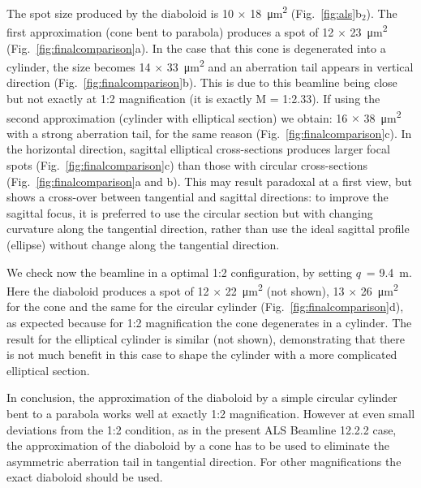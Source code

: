 \documentclass[preprint]{iucr}       %
\newcommand{\inred}[1]{{\color{red}#1}}
\begin{document}
The spot size produced by the diaboloid is 10 $\times$ \SI{18}{\micro\meter^2} (Fig.~\ref{fig:als}b$_2$). The first approximation (cone bent to parabola) produces a spot of 12 $\times$ \SI{23}{\micro\meter^2} (Fig.~\ref{fig:finalcomparison}a). In the case that this cone is degenerated into a cylinder, the size becomes 14 $\times$ \SI{33}{\micro\meter^2} and an aberration tail appears in vertical direction (Fig.~\ref{fig:finalcomparison}b). This is due to this beamline being close but not exactly at 1:2 magnification (it is exactly M = 
\inred{1:2.33}). If using the second approximation (cylinder with elliptical section) we obtain: 16 $\times$ \SI{38}{\micro\meter^2} with a strong aberration tail, for the same reason (Fig.~\ref{fig:finalcomparison}c).
In the horizontal direction,  sagittal elliptical cross-sections produce\inred{s larger} focal spots (Fig.~\ref{fig:finalcomparison}c) than those with circular cross-sections (Fig.~\ref{fig:finalcomparison}a and b). \inred{This may result paradoxal at a first view, but shows a cross-over between tangential and sagittal directions: to improve the sagittal focus, it is preferred to use the circular section but with changing curvature along the tangential direction, rather than use the ideal sagittal profile (ellipse) without change along the tangential direction. }

We check now the beamline in a optimal 1:2 configuration, by setting $q$~= \SI{9.4}{\meter}. Here the diaboloid produces a spot of 12 $\times$ \SI{22}{\micro\meter^2} (not shown), 13 $\times$ \SI{26}{\micro\meter^2} for the cone and \inred{the same} for the circular cylinder (Fig.~\ref{fig:finalcomparison}d), as expected because for 1:2 magnification the cone degenerates in a cylinder. The result for the elliptical cylinder is similar (not shown), demonstrating that there is not much benefit in this case to shape the cylinder with a more complicated elliptical section.  

In conclusion, the approximation of the diaboloid by a simple circular cylinder bent to a parabola works well at exactly 1:2 magnification. However at even small deviations from the 1:2 condition, as in the present ALS Beamline 12.2.2 case, the approximation of the diaboloid by a cone has to be used to eliminate the asymmetric aberration tail in tangential direction. For other magnifications the exact diaboloid should be used.
\end{document}
